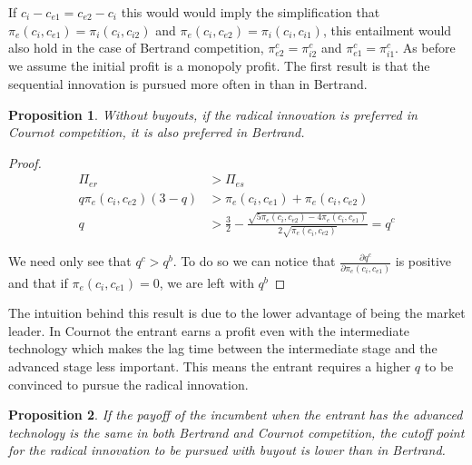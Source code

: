 \documentclass[12pt]{report}
\newtheorem{proposition}{Proposition}
\numberwithin{equation}{section}
\begin{document}
If $c_i-c_{e1}=c_{e2}-c_i$ this would would imply the simplification that $\pi_{e}(c_i,c_{e1})=\pi_{i}(c_{i},c_{i2})$ and $\pi_{e}(c_i,c_{e2})=\pi_{i}(c_{i},c_{i1})$, this entailment would also hold in the case of Bertrand competition, $\pi_{e2}^{c}=\pi_{i2}^{c}$ and $\pi_{e1}^{c}=\pi_{i1}^{c}$. As before we assume the initial profit is a monopoly profit. The first result is that the sequential innovation is pursued more often in than in Bertrand.

\begin{proposition}
Without buyouts, if the radical innovation is preferred in Cournot competition, it is also preferred in Bertrand. 
\end{proposition}

\begin{proof}
\begin{align*}
\Pi_{er}&>\Pi_{es} \\
q \pi_{e}(c_i,c_{e2}) (3-q) &> \pi_{e}(c_i,c_{e1})+\pi_{e}(c_i,c_{e2}) \\
q&> 
 \frac{3}{2}-\frac{ \sqrt{5 \pi_{e}(c_i,c_{e2})-4 \pi_{e}(c_i,c_{e1})}}{2 \sqrt{\pi_{e}(c_i,c_{e2})}}=q^{c}
\end{align*}

We need only see that $q^{c}>q^{b}$. To do so we can notice that $\frac{\partial q^c}{\partial \pi_{e}(c_i,c_{e1}) }$ is positive and that if $\pi_{e}(c_i,c_{e1})=0$, we are left with $q^{b}$
\end{proof}

The intuition behind this result is due to the lower advantage of being the market leader. In Cournot the entrant earns a profit even with the intermediate technology which makes the lag time between the intermediate stage and the advanced stage less important. This means the entrant requires a higher $q$ to be convinced to pursue the radical innovation.  

\begin{proposition}
If the payoff of the incumbent when the entrant has the advanced technology is the same in both Bertrand and Cournot competition, the cutoff point for the radical innovation to be pursued with buyout is lower than in Bertrand. 
\end{proposition}
\end{document}

